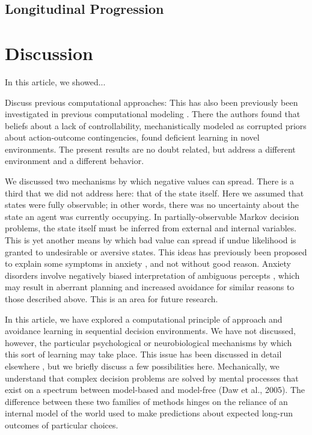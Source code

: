 \documentclass[11pt]{article} %
\begin{document}
\subsection{Longitudinal Progression}

\section{Discussion}

In this article, we showed...

Discuss previous computational approaches: This has also been previously been
investigated in previous computational modeling \cite{Huys2009}. There
the authors found that beliefs about a lack of controllability, mechanistically
modeled as corrupted priors about action-outcome contingencies, found deficient
learning in novel environments. The present results are no doubt related, but
address a different environment and a different behavior.

We discussed two mechanisms by which negative values can spread. There is a third
that we did not address here: that of the state itself. Here we assumed that states
were fully observable; in other words, there was no uncertainty about the state
an agent was currently occupying. In partially-observable Markov decision problems,
the state itself must be inferred from external and internal variables. This is
yet another means by which bad value can spread if undue likelihood is granted
to undesirable or aversive states. This ideas has previously been proposed to
explain some symptoms in anxiety \cite{Paulus2012}, and not without good reason.
Anxiety disorders involve negatively biased interpretation of ambiguous percepts
\cite{Hartley2012}, which may result in aberrant planning and increased avoidance
for similar reasons to those described above. This is an area for future research.

In this article, we have explored a computational principle of approach and
avoidance learning in sequential decision environments. We have not discussed,
however, the particular psychological or neurobiological mechanisms by which this
sort of learning may take place. This issue has been discussed in detail elsewhere
\cite{Bishop2018}, but we briefly discuss a few possibilities here. Mechanically,
we understand that complex decision problems are solved by mental processes that
exist on a spectrum between model-based and model-free (Daw et al., 2005). The
difference between these two families of methods hinges on the reliance of an
internal model of the world used to make predictions about expected long-run
outcomes of particular choices.
\end{document}

